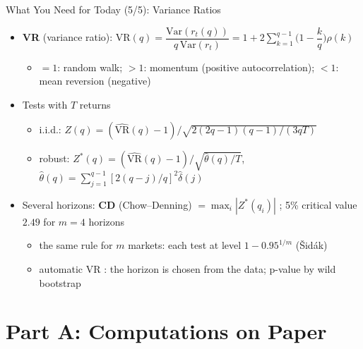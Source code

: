 \begin{frame}{What You Need for Today (5/5): Variance Ratios}
\itemsize{\small}
\begin{itemize}
    \item \textbf{VR} (variance ratio): $\mathrm{VR}(q) = \dfrac{\mathrm{Var}(r_t(q))}{q\,\mathrm{Var}(r_t)} = 1 + 2\sum_{k=1}^{q-1}\Big(1 - \dfrac{k}{q}\Big)\rho(k)$ 
    \begin{itemize}
        \item $= 1$: random walk; $> 1$: momentum (positive autocorrelation); $< 1$: mean reversion (negative)
    \end{itemize}
    \item Tests with $T$ returns
    \begin{itemize}
        \item i.i.d.: $Z(q) = (\widehat{\mathrm{VR}}(q) - 1)\big/\sqrt{2(2q-1)(q-1)/(3qT)}$
        \item robust: $Z^*(q) = (\widehat{\mathrm{VR}}(q) - 1)\big/\sqrt{\hat\theta(q)/T}$, $\hat\theta(q) = \sum_{j=1}^{q-1}[2(q-j)/q]^2\hat\delta(j)$
    \end{itemize}
    \item Several horizons: \textbf{CD} (Chow--Denning) $= \max_i|Z^*(q_i)|$ ; 5\% critical value $2.49$ for $m = 4$ horizons
    \begin{itemize}
        \item the same rule for $m$ markets: each test at level $1 - 0.95^{1/m}$ (Šidák)
        \item automatic VR : the horizon is chosen from the data; p-value by wild bootstrap 
    \end{itemize}
\end{itemize}
\end{frame}


\section{Part A: Computations on Paper}

